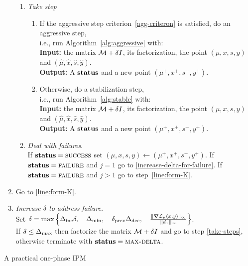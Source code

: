 \documentclass{article}
\begin{document}
\begin{algorithm}[H]
\begin{enumerate}[label*=A.{\arabic*}]
\begin{enumerate}[label*=.{\arabic*}]
\item \emph{Take step}\label{line:take-step}
\begin{enumerate}[label=-Case {\Roman*}]
\item If the aggressive step criterion~\eqref{agg-criteron} is satisfied, do an aggressive step, \\
i.e., run Algorithm~\ref{alg:aggressive} with: \\
\hspace*{0.1cm}  \textbf{Input:} the matrix $\mathcal{M} + \delta I$, its factorization, the point $(\mu, x, s, y)$ and $(\hat{\mu}, \hat{x}, \hat{s}, \hat{y})$. \\
\hspace*{0.1cm}  \textbf{Output:} A $\textbf{status}$ and a new point $(\mu^{+},x^{+},s^{+},y^{+})$.
\item Otherwise, do a stabilization step, \\
i.e., run Algorithm~\ref{alg:stable} with: \\
\hspace*{0.1cm} \textbf{Input:} the matrix $\mathcal{M} + \delta I$, its factorization, the point $(\mu, x, s, y)$ and $(\hat{\mu}, \hat{x}, \hat{s}, \hat{y})$. \\
\hspace*{0.1cm} \textbf{Output:} A $\textbf{status}$ and a new point $(\mu^{+},x^{+},s^{+},y^{+})$.
\end{enumerate}
\item \emph{Deal with failures}. \\
If $\textbf{status} = \textsc{success}$ set $(\mu, x, s, y) \gets ( \mu^{+}, x^{+},s^{+},y^{+})$. If $\textbf{status} = \textsc{failure}$ and $j = 1$ go to \eqref{increase-delta-for-failure}.  If $\textbf{status} = \textsc{failure}$ and $j > 1$ go to step~\eqref{line:form-K}.
\end{enumerate}
\item 
Go to \eqref{line:form-K}.
\item \label{increase-delta-for-failure} \emph{Increase $\delta$ to address failure.} \\
Set $\delta = \max\left\{\Delta_{\text{inc}} \delta, \quad \Delta_{\min}, \quad \delta_{\text{prev}} \Delta_{\text{dec}}, \quad \frac{\| \grad \mathcal{L}_{\mu}(x,y) \|_{\infty}}{ \| d_{x} \|_{\infty} } \right\}$. \\
If $\delta \le \Delta_{\max}$ then factorize the matrix $\mathcal{M} + \delta I$ and go to step \eqref{take-steps}, otherwise terminate with $\textbf{status} = \textsc{max-delta}$.
\end{enumerate}
\caption{A practical one-phase IPM}\label{one-phase-IPM}
\end{algorithm}
\end{document}
